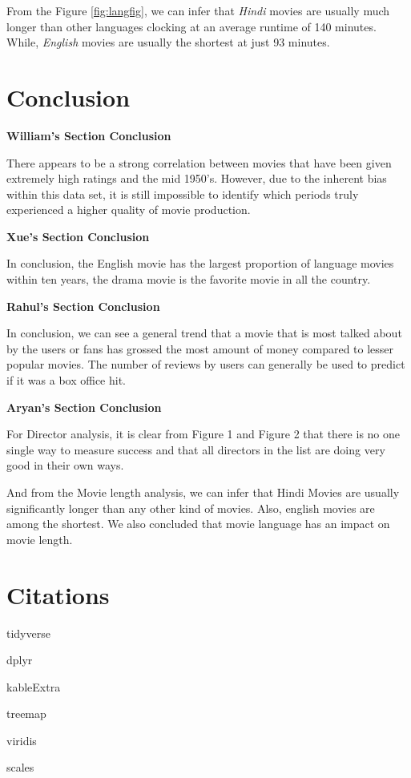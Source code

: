 \documentclass[11pt,a4paper,]{article}
\begin{document}
From the Figure \ref{fig:langfig}, we can infer that \emph{Hindi} movies are usually much longer than other languages clocking at an average runtime of 140 minutes. While, \emph{English} movies are usually the shortest at just 93 minutes.

\hypertarget{conclusion}{%
\section{Conclusion}\label{conclusion}}

\textbf{William's Section Conclusion}

There appears to be a strong correlation between movies that have been given extremely high ratings and the mid 1950's. However, due to the inherent bias within this data set, it is still impossible to identify which periods truly experienced a higher quality of movie production.

\textbf{Xue's Section Conclusion}

In conclusion, the English movie has the largest proportion of language movies within ten years, the drama movie is the favorite movie in all the country.

\textbf{Rahul's Section Conclusion}

In conclusion, we can see a general trend that a movie that is most talked about by the users or fans has grossed the most amount of money compared to lesser popular movies. The number of reviews by users can generally be used to predict if it was a box office hit.

\textbf{Aryan's Section Conclusion}

For Director analysis, it is clear from Figure 1 and Figure 2 that there is no one single way to measure success and that all directors in the list are doing very good in their own ways.

And from the Movie length analysis, we can infer that Hindi Movies are usually significantly longer than any other kind of movies. Also, english movies are among the shortest. We also concluded that movie language has an impact on movie length.

\hypertarget{citations}{%
\section{Citations}\label{citations}}

tidyverse \textcite{tidyverse}

dplyr \textcite{dplyr}

kableExtra \textcite{kableExtra}

treemap \textcite{treemap}

viridis \textcite{viridis}

scales \textcite{scales}

\printbibliography
\end{document}

